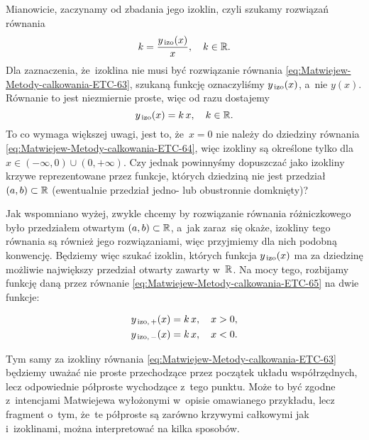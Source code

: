 \documentclass[a4paper,11pt]{article}
\numberwithin{equation}{section}
\begin{document}
Mianowicie, zaczynamy od zbadania jego izoklin, czyli szukamy rozwiązań
równania
\begin{equation}
  \label{eq:Uwagi-do-konkrentych-stron-45}
  k = \frac{ y_{ \, \textrm{izo} }( x ) }{ x }, \quad
  k \in \mathbb{R}.
\end{equation}
Dla zaznaczenia, że~izoklina nie musi być rozwiązanie równania
\eqref{eq:Matwiejew-Metody-calkowania-ETC-63}, szukaną funkcję oznaczyliśmy
$y_{ \, \textrm{izo} }( x )$, a~nie $y( x )$. Równanie to jest niezmiernie proste,
więc od razu dostajemy
\begin{equation}
  \label{eq:Uwagi-do-konkrentych-stron-46}
  y_{ \, \textrm{izo} }( x ) = k \, x, \quad
  k \in \mathbb{R}.
\end{equation}
To co wymaga większej uwagi, jest to, że~$x = 0$ nie należy do dziedziny
równania \eqref{eq:Matwiejew-Metody-calkowania-ETC-64}, więc izokliny są
określone tylko dla $x \in ( -\infty, 0 ) \cup ( 0, +\infty )$. Czy jednak powinnyśmy
dopuszczać jako izokliny krzywe reprezentowane przez funkcje, których
dziedziną nie jest przedział $( a, b ) \subset \mathbb{R}$ (ewentualnie przedział
jedno- lub obustronnie domknięty)?

Jak wspomniano wyżej, zwykle chcemy by rozwiązanie równania różniczkowego
było przedziałem otwartym $( a, b ) \subset \mathbb{R}$, a~jak zaraz~się okaże,
izokliny tego równania są również jego rozwiązaniami, więc przyjmiemy dla
nich podobną konwencję. Będziemy więc szukać izoklin, których funkcja
$y_{ \, \textrm{izo} }( x )$ ma za dziedzinę możliwie największy przedział otwarty
zawarty w~$\mathbb{R}$. Na mocy tego, rozbijamy funkcję daną przez równanie
\eqref{eq:Matwiejew-Metody-calkowania-ETC-65} na dwie funkcje:

\negVerSpaceFour


\begin{subequations}

  \begin{align}
    \label{eq:Uwagi-do-konkrentych-stron-47-A}
    y_{ \, \textrm{izo}, \, + }( x )
    &=
      k \, x, \quad
      x > 0, \\
    \label{eq:Uwagi-do-konkrentych-stron-47-B}
    y_{ \, \textrm{izo}, \, - }( x )
    &=
      k \, x, \quad
      x < 0.
  \end{align}

\end{subequations}


\noindent
Tym samy za izokliny równania \eqref{eq:Matwiejew-Metody-calkowania-ETC-63}
będziemy uważać nie proste przechodzące przez początek układu
współrzędnych, lecz odpowiednie półproste wychodzące z~tego punktu. Może to
być zgodne z~intencjami Matwiejewa wyłożonymi w~opisie omawianego
przykładu, lecz fragment o~tym, że~te półproste są zarówno krzywymi
całkowymi jak i~izoklinami, można interpretować na kilka sposobów.
\end{document}
